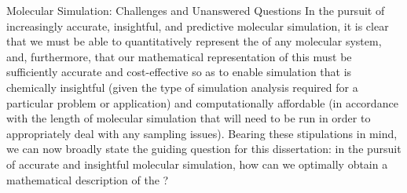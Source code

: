 \begin{section}{Molecular Simulation: Challenges and Unanswered Questions}
In the pursuit of increasingly accurate, insightful, and predictive molecular
simulation, it is clear that we must be able to quantitatively represent the
\pes of any molecular system, and, furthermore, that our mathematical
representation of this \pes must be sufficiently accurate and cost-effective so
as to enable simulation that is chemically insightful (given the type of
simulation analysis required for a particular problem or application) and
computationally affordable (in accordance with the length of molecular simulation that will
need to be run in order to appropriately deal with any sampling issues). 
Bearing these stipulations in mind, we can now broadly state the guiding
question for this dissertation: in the pursuit of
accurate and insightful molecular simulation, how can we optimally
obtain a mathematical description of the \pes?

\end{section}
